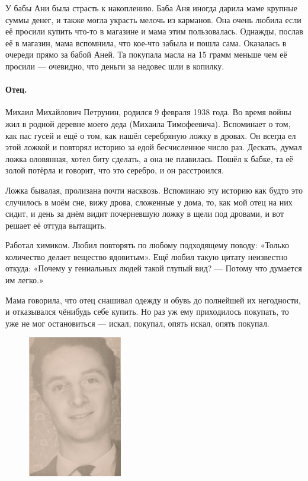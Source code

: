 \documentclass{book}
\begin{document}
У бабы Ани была страсть к накоплению.
Баба Аня иногда дарила маме крупные суммы денег, и также могла украсть мелочь из карманов.
Она очень любила если её просили купить что-то в магазине и мама этим пользовалась.
Однажды, послав её в магазин, мама вспомнила, что кое-что забыла и пошла сама.
Оказалась в очереди прямо за бабой Аней.
Та покупала масла на 15 грамм меньше чем её просили — очевидно, что деньги за недовес шли в копилку.

\paragraph{Отец.}  Михаил Михайлович Петрунин, родился 9 февраля 1938 года.
Во время войны жил в родной деревне моего деда (Михаила Тимофеевича).
Вспоминает о том, как пас гусей и ещё о том, как нашёл серебряную ложку в дровах.
Он всегда ел этой ложкой и повторял историю за едой бесчисленное число раз.
Дескать, думал ложка оловянная, хотел биту сделать, а она не плавилась.
Пошёл к бабке, та её золой потёрла и говорит, что это серебро, и он расстроился.

Ложка бывалая, пролизана почти насквозь.
Вспоминаю эту историю как будто это случилось в моём сне, вижу дрова, сложенные у дома, то, как мой отец на них сидит, и день за днём видит почерневшую ложку в щели под дровами, и вот решает её оттуда вытащить.

Работал химиком.
Любил повторять по любому подходящему поводу: «Только количество делает вещество ядовитым».
Ещё любил такую цитату неизвестно откуда:
«Почему у гениальных людей такой глупый вид? --- Потому что думается им легко.»

Мама говорила, что отец снашивал одежду и обувь до полнейшей их негодности, и отказывался чёнибудь себе купить.
Но раз уж ему приходилось покупать, то уже не мог остановиться --- искал, покупал, опять искал, опять покупал.

\begin{figure}
\vskip-4mm
\centering
\includegraphics[width=41mm,angle=0]{pics/papa}
\end{figure}
\end{document}
